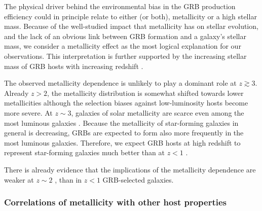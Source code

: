 \documentclass[traditabstract, longauth]{aa}
\begin{document}
{The physical driver behind the environmental bias in the GRB production efficiency could in principle relate to either (or both), metallicity or a high stellar mass. Because of the well-studied impact that metallicity has on stellar evolution, and the lack of an obvious link between GRB formation and a galaxy's stellar mass, we consider a metallicity effect as the most logical explanation for our observations. This interpretation is further supported by the increasing stellar mass of GRB hosts with increasing redshift \citep{2015arXiv150402479P}.}

The observed metallicity dependence is unlikely to play a dominant role at $z\gtrsim3$. Already $z > 2$, the metallicity distribution is somewhat shifted towards lower metallicities although the selection biases against low-luminosity hosts become more severe. At $z\sim3$, galaxies of solar metallicity are scarce even among the most luminous galaxies \citep{2014A&A...563A..58T}. Because the metallicity of star-forming galaxies in general is decreasing, GRBs are expected to form also more frequently in the most luminous galaxies. Therefore, we expect GRB hosts at high redshift to represent star-forming galaxies much better than at $z<1$ \citep[see also][]{2015arXiv150305323G, 2015arXiv150402479P}.

There is already evidence that the implications of the metallicity dependence are weaker at $z\sim2$ \citep{2013ApJ...778..128P, 2015arXiv150304246S}, than in $z<1$ GRB-selected galaxies.

\subsubsection{Correlations of metallicity with other host properties}
\label{sec:corrzz}
\end{document}
